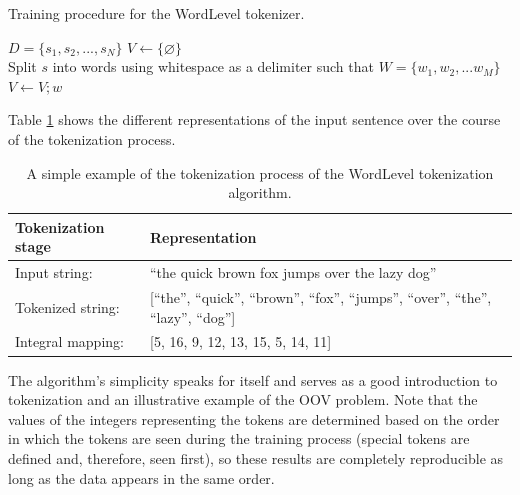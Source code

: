 \documentclass[12pt]{article}
\begin{document}
\begin{algorithm}[!t]
    \caption{Training procedure for the WordLevel tokenizer.}
    \label{alg:wordlevel_training}
    \begin{algorithmic}
        \State $D = \{s_1, s_2, ..., s_N\}$
        \State $V \gets \{\varnothing\}$
        \\

        \State Split $s$ into words using whitespace as a delimiter such that
        \State $W=\{w_1, w_2, ... w_M\}$
        \\

        \State $V \gets V;w$
        \EndIf
        \EndFor
        \EndFor
    \end{algorithmic}
\end{algorithm}

Table \ref{tab:wordlevel_tokenization_example} shows the different representations of the input sentence over the course of the tokenization process.

\begin{table}[!t]
    \centering
    \begin{tabular}{l l}
        \toprule
        Tokenization stage & Representation                                                                            \\
        \midrule
        Input string:      & ``the quick brown fox jumps over the lazy dog''                                           \\
        Tokenized string:  & [``the'', ``quick'', ``brown'', ``fox'', ``jumps'', ``over'', ``the'', ``lazy'', ``dog''] \\
        Integral mapping:  & [5, 16, 9, 12, 13, 15, 5, 14, 11]                                                         \\
        \bottomrule
    \end{tabular}
    \caption{A simple example of the tokenization process of the WordLevel tokenization algorithm.}
    \label{tab:wordlevel_tokenization_example}
\end{table}

The algorithm's simplicity speaks for itself and serves as a good introduction to tokenization and an illustrative example of the OOV problem. Note that the values of the integers representing the tokens are determined based on the order in which the tokens are seen during the training process (special tokens are defined and, therefore, seen first), so these results are completely reproducible as long as the data appears in the same order.
\end{document}
